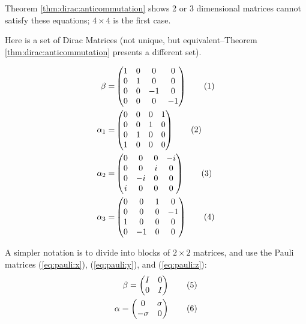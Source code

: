 \documentclass[]{article}
\newcommand\numberthis{\addtocounter{equation}{1}\tag{\theequation}}
\begin{document}
Theorem \ref{thm:dirac:anticommutation} shows 2 or 3 dimensional matrices cannot satisfy these equations; $4 \times 4$ is the first case.

Here is a set of Dirac Matrices (not unique, but equivalent--Theorem \ref{thm:dirac:anticommutation} presents a different set).

\begin{align*}
	\beta =& \begin{pmatrix}
		1&0&0&0\\
		0&1&0&0\\
		0&0&-1&0\\
		0&0&0&-1
	\end{pmatrix} \numberthis \label{eq:beta:1}\\
	\alpha_1 =& \begin{pmatrix}
		0&0&0&1\\
		0&0&1&0\\
		0&1&0&0\\
		1&0&0&0
	\end{pmatrix}\numberthis \label{eq:alpha1:1}\\ 
	\alpha_2 =& \begin{pmatrix}
		0&0&0&-i\\
		0&0&i&0\\
		0&-i&0&0\\
		i&0&0&0
	\end{pmatrix} \numberthis \label{eq:alpha2:1} \\ 
	\alpha_3 =& \begin{pmatrix}
		0&0&1&0\\
		0&0&0&-1\\
		1&0&0&0\\
		0&-1&0&0 
	\end{pmatrix} \numberthis \label{eq:alpha3:1}
\end{align*}

A simpler notation is to divide into blocks of $2\times 2$ matrices, and use the Pauli matrices (\ref{eq:pauli:x}), (\ref{eq:pauli:y}), and (\ref{eq:pauli:z}):
\begin{align*}
	\beta = \begin{pmatrix}
		I&0\\
		0&I
	\end{pmatrix} \numberthis \label{eq:dirac:block:1}\\
	\alpha = \begin{pmatrix}
		0&\sigma\\
		-\sigma&0
	\end{pmatrix} \numberthis \label{eq:dirac:block:2}
\end{align*}
\end{document}
